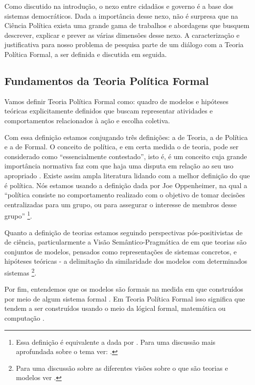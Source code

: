 
Como discutido na introdução, o nexo entre cidadãos e governo é a base dos
sistemas democráticos. Dada a importância desse nexo, não é surpresa que na
Ciência Política exista uma grande gama de trabalhos e abordagens que busquem
descrever, explicar e prever as várias dimensões desse nexo. A caracterização e
justificativa para nosso problema de pesquisa parte de um diálogo com a Teoria
Política Formal, a ser definida e discutida em seguida.

\subsection{Fundamentos da Teoria Política Formal}

Vamos definir Teoria Política Formal como: quadro de modelos e hipóteses
teóricas explicitamente definidos que buscam representar atividades e
comportamentos relacionados à ação e escolha coletiva.

Com essa definição estamos conjugando três definições: a de Teoria, a de
Política e a de Formal. O conceito de política, e em certa medida o de teoria,
pode ser considerado como ``essencialmente contestado'', isto é, é um conceito
cuja grande importância normativa faz com que haja uma disputa em relação ao seu
uso apropriado \cite{collier2006essentially}. Existe assim ampla literatura
lidando com a melhor definição do que é política. Nós estamos usando a definição
dada por Joe Oppenheimer, na qual a ``política consiste
no comportamento realizado com o objetivo de tomar decisões centralizadas para
um grupo, ou para assegurar o interesse de membros desse grupo'' \cite[p.
I]{oppenheimer2012principles}\footnote{Essa definição é equivalente a dada por
  . Para uma discussão mais aprofundada sobre o
  tema ver: .}.

Quanto a definição de teorias estamos seguindo perspectivas pós-positivistas de
de ciência, particularmente a Visão Semântico-Pragmática de
 em que teorias são conjuntos de modelos, pensados
como representações de sistemas concretos, e hipóteses teóricas - a delimitação
da similaridade dos modelos com determinados sistemas \footnote{Para uma
  discussão sobre as diferentes visões sobre o que são teorias e modelos ver
  . }.

Por fim, entendemos que os modelos são formais na medida em que construídos por
meio de algum sistema formal \cite{wong2015formal}. Em Teoria Política Formal
isso significa que tendem a ser construídos usando o meio da lógical formal,
matemática ou computação \cite{morton1999methods}.






